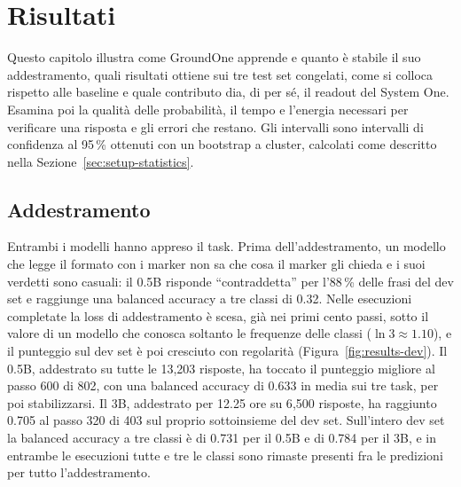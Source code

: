 \chapter{Risultati}
\label{sec:results}


Questo capitolo illustra come GroundOne apprende e quanto è stabile il suo addestramento, quali risultati ottiene sui tre
test set congelati, come si colloca rispetto alle baseline e quale contributo dia, di per sé, il readout del System One.
Esamina poi la qualità delle probabilità, il tempo e l'energia necessari per verificare una risposta e gli errori che
restano. Gli intervalli sono intervalli di confidenza al 95\,\% ottenuti con un bootstrap a cluster, calcolati come
descritto nella Sezione~\ref{sec:setup-statistics}.

\section{Addestramento}
\label{sec:results-training}

Entrambi i modelli hanno appreso il task. Prima dell'addestramento, un modello che legge il formato con i marker non
sa che cosa il marker gli chieda e i suoi verdetti sono casuali: il 0.5B risponde ``contraddetta'' per l'88\,\% delle
frasi del dev set e raggiunge una balanced accuracy a tre classi di 0.32. Nelle esecuzioni completate la loss di
addestramento è scesa, già nei primi cento passi, sotto il valore di un modello che conosca soltanto le frequenze delle
classi ($\ln 3 \approx 1.10$), e il punteggio sul dev set è poi cresciuto con regolarità (Figura~\ref{fig:results-dev}).
Il 0.5B, addestrato su tutte le 13{,}203 risposte, ha toccato il punteggio migliore al passo 600 di 802, con una balanced
accuracy di 0.633 in media sui tre task, per poi stabilizzarsi. Il 3B, addestrato per 12.25 ore su 6{,}500 risposte,
ha raggiunto 0.705 al passo 320 di 403 sul proprio sottoinsieme del dev set. Sull'intero dev set la balanced accuracy a
tre classi è di 0.731 per il 0.5B e di 0.784 per il 3B, e in entrambe le esecuzioni tutte e tre le classi sono rimaste
presenti fra le predizioni per tutto l'addestramento.

